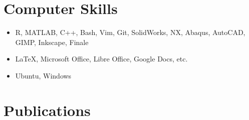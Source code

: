 \documentclass[letterpaper]{article}
\begin{document}
\section{Computer Skills}
\begin{center}
\begin{itemize}
\item R, MATLAB, C++, Bash, Vim, Git, SolidWorks, NX, Abaqus, AutoCAD, GIMP, Inkscape, Finale
\item \LaTeX, Microsoft Office, Libre Office, Google Docs, etc.
\item Ubuntu, Windows
\end{itemize}
% 
% 
\end{center}


\section{Publications}
\nocite{shields2016design} %
\printbibliography

\end{document}
